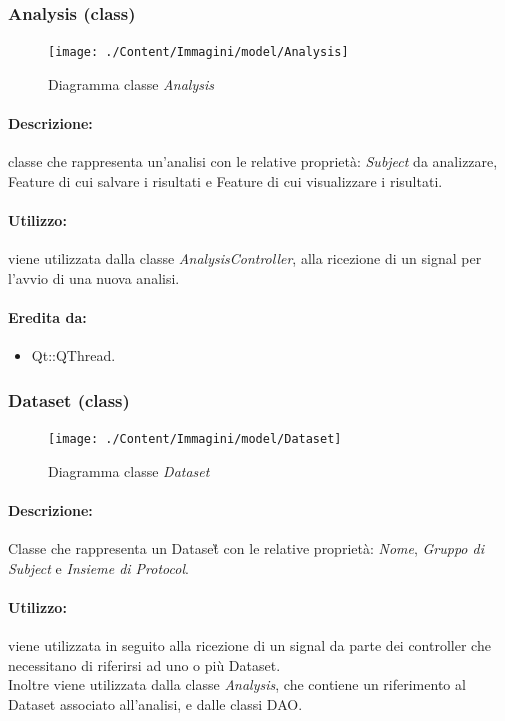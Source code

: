 	\subsubsection{Analysis (class)}
	\begin{figure}[!h]
		\centering
		\texttt{[image: ./Content/Immagini/model/Analysis]}
		\caption{Diagramma classe \textsl{Analysis}}
	\end{figure}
	\paragraph{Descrizione:} classe che rappresenta un’analisi con le relative proprietà: \emph{Subject}\g{} da
analizzare, Feature\g{} di cui salvare i risultati e Feature\g{} di cui visualizzare i risultati.
	\paragraph{Utilizzo:} viene utilizzata dalla classe \textsl{AnalysisController}, alla ricezione di un signal\g{} per l'avvio di una nuova analisi.
	\paragraph{Eredita da:}
		\begin{itemize}
			\item Qt::QThread.
		\end{itemize}
	\subsubsection{Dataset (class)}
	\begin{figure}[!h]
		\centering
		\texttt{[image: ./Content/Immagini/model/Dataset]}
		\caption{Diagramma classe \textsl{Dataset}}
	\end{figure}
	\paragraph{Descrizione:} Classe che rappresenta un Dataset\G{} con le relative proprietà: \emph{Nome}, \emph{Gruppo di Subject\g{}} e \emph{Insieme di Protocol}\g{}.
	\paragraph{Utilizzo:} viene utilizzata in seguito alla ricezione di un signal\g{} da parte dei controller che necessitano di riferirsi ad uno o più Dataset\g{}.
\\Inoltre viene utilizzata dalla classe \textsl{Analysis}, che contiene un riferimento al Dataset\g{} associato all'analisi, e dalle classi DAO.
